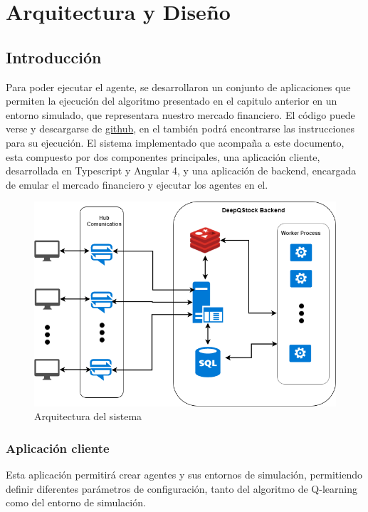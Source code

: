 \chapter{Arquitectura y Diseño}


\section{Introducción}

Para poder ejecutar el agente, se desarrollaron un conjunto de aplicaciones que permiten la ejecución del algoritmo presentado en el capitulo anterior en un entorno simulado, que representara nuestro mercado financiero.
El código puede verse y descargarse de \href{https://github.com/jcaramello/deepQ-stock}{github}, en el también podrá encontrarse las instrucciones para su ejecución. El sistema implementado que acompaña a este documento, esta compuesto por dos componentes principales, una aplicación cliente, desarrollada en Typescript y Angular 4, y una aplicación de backend, 
encargada de emular el mercado financiero y ejecutar los agentes en el.

\begin{figure}[h!]
	\includegraphics[scale=0.5]{imagenes/deepQStockArchitectureOverview.png}
	\caption{Arquitectura del sistema}
\end{figure}

\subsection{Aplicación cliente}
Esta aplicación permitirá crear agentes y sus entornos de simulación, permitiendo definir diferentes parámetros de configuración, tanto del algoritmo de Q-learning como del entorno de simulación.\\

